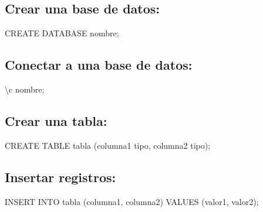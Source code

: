 \documentclass[
  a4paper,
  onepage,
  openany]{scrreprt}
\newenvironment{Shaded}{\begin{snugshade}}{\end{snugshade}}
\newcommand{\KeywordTok}[1]{\textcolor[rgb]{0.00,0.23,0.31}{#1}}
\newcommand{\NormalTok}[1]{\textcolor[rgb]{0.00,0.23,0.31}{#1}}
\begin{document}
\hypertarget{crear-una-base-de-datos}{%
\subsection{Crear una base de datos:}\label{crear-una-base-de-datos}}

\begin{Shaded}
\begin{Highlighting}[]
\KeywordTok{CREATE} \KeywordTok{DATABASE}\NormalTok{ nombre;}
\end{Highlighting}
\end{Shaded}

\hypertarget{conectar-a-una-base-de-datos}{%
\subsection{Conectar a una base de
datos:}\label{conectar-a-una-base-de-datos}}

\begin{Shaded}
\begin{Highlighting}[]
\NormalTok{\textbackslash{}c nombre;}
\end{Highlighting}
\end{Shaded}

\hypertarget{crear-una-tabla}{%
\subsection{Crear una tabla:}\label{crear-una-tabla}}

\begin{Shaded}
\begin{Highlighting}[]
\KeywordTok{CREATE} \KeywordTok{TABLE}\NormalTok{ tabla (columna1 tipo, columna2 tipo);}
\end{Highlighting}
\end{Shaded}

\hypertarget{insertar-registros}{%
\subsection{Insertar registros:}\label{insertar-registros}}

\begin{Shaded}
\begin{Highlighting}[]
\KeywordTok{INSERT} \KeywordTok{INTO}\NormalTok{ tabla (columna1, columna2) }\KeywordTok{VALUES}\NormalTok{ (valor1, valor2);}
\end{Highlighting}
\end{Shaded}
\end{document}
